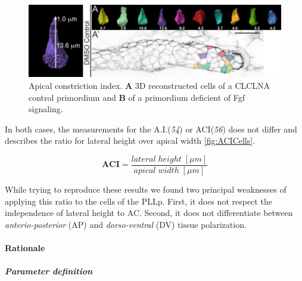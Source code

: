 \documentclass[11pt,singlespacinge,twoside]{reedthesis} %
\begin{document}
\begin{figure}

{\centering \includegraphics[width=0.75\linewidth]{figure/02-MaMo/ACI/Harding} 

}

\caption[Apical constriction index]{Apical constriction index. \textbf{A} 3D reconstructed cells of a CLCLNA control primordium and \textbf{B} of a primordium deficient of Fgf signaling.}\label{fig:ACHard}
\end{figure}
\noindent In both cases, the measurements for the A.I.(\emph{54}) or ACI(\emph{56}) does not differ and describes the ratio for lateral height over apical width \ref{fig:ACICells}.

\[\mathbf{ACI} = \frac{lateral\;height\;[\mu m]}{apical\;width\;[\mu m]}\]

\noindent While trying to reproduce these results we found two principal weaknesses of applying this ratio to the cells of the PLLp. First, it does not respect the independence of lateral height to AC. Second, it does not differentiate between \emph{anterio-posterior} (AP) and \emph{dorso-ventral} (DV) tissue polarization.

\hypertarget{rationale}{%
\paragraph{Rationale}\label{rationale}}

\hypertarget{ACI-param}{%
\subparagraph{Parameter definition}\label{ACI-param}}
\end{document}
